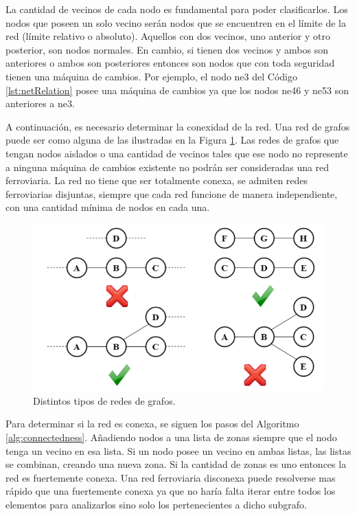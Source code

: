     La cantidad de vecinos de cada nodo es fundamental para poder clasificarlos. Los nodos que poseen un solo vecino serán nodos que se encuentren en el límite de la red (límite relativo o absoluto). Aquellos con dos vecinos, uno anterior y otro posterior, son nodos normales. En cambio, si tienen dos vecinos y ambos son anteriores o ambos son posteriores entonces son nodos que con toda seguridad tienen una máquina de cambios. Por ejemplo, el nodo ne3 del Código \ref{lst:netRelation} posee una máquina de cambios ya que los nodos ne46 y ne53 son anteriores a ne3.

    A continuación, es necesario determinar la conexidad de la red. Una red de grafos puede ser como alguna de las ilustradas en la Figura \ref{fig:conexidad}. Las redes de grafos que tengan nodos aislados o una cantidad de vecinos tales que ese nodo no represente a ninguna máquina de cambios existente no podrán ser consideradas una red ferroviaria. La red no tiene que ser totalmente conexa, se admiten redes ferroviarias disjuntas, siempre que cada red funcione de manera independiente, con una cantidad mínima de nodos en cada una.   

    \begin{figure}[!h]
        \centering
        \includegraphics[width=1\textwidth]{Figuras/conexo.PNG}
        \centering\caption{Distintos tipos de redes de grafos.}
        \label{fig:conexidad}
    \end{figure}

    Para determinar si la red es conexa, se siguen los pasos del Algoritmo \ref{alg:connectedness}. Añadiendo nodos a una lista de zonas siempre que el nodo tenga un vecino en esa lista. Si un nodo posee un vecino en ambas listas, las listas se combinan, creando una nueva zona. Si la cantidad de zonas es uno entonces la red es fuertemente conexa. Una red ferroviaria disconexa puede resolverse mas rápido que una fuertemente conexa ya que no haría falta iterar entre todos los elementos para analizarlos sino solo los pertenecientes a dicho subgrafo.
        
